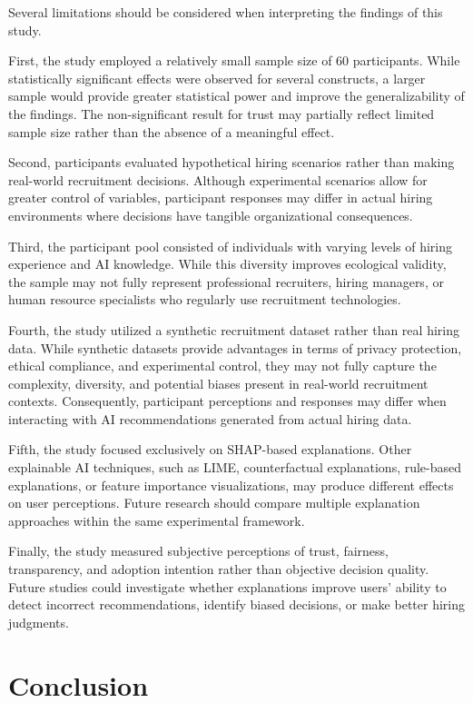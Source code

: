 \documentclass[conference]{IEEEtran}
\begin{document}
Several limitations should be considered when interpreting the findings of this study.

First, the study employed a relatively small sample size of 60 participants. While statistically significant effects were observed for several constructs, a larger sample would provide greater statistical power and improve the generalizability of the findings. The non-significant result for trust may partially reflect limited sample size rather than the absence of a meaningful effect.

Second, participants evaluated hypothetical hiring scenarios rather than making real-world recruitment decisions. Although experimental scenarios allow for greater control of variables, participant responses may differ in actual hiring environments where decisions have tangible organizational consequences.

Third, the participant pool consisted of individuals with varying levels of hiring experience and AI knowledge. While this diversity improves ecological validity, the sample may not fully represent professional recruiters, hiring managers, or human resource specialists who regularly use recruitment technologies.

Fourth, the study utilized a synthetic recruitment dataset rather than real hiring data. While synthetic datasets provide advantages in terms of privacy protection, ethical compliance, and experimental control, they may not fully capture the complexity, diversity, and potential biases present in real-world recruitment contexts. Consequently, participant perceptions and responses may differ when interacting with AI recommendations generated from actual hiring data.

Fifth, the study focused exclusively on SHAP-based explanations. Other explainable AI techniques, such as LIME, counterfactual explanations, rule-based explanations, or feature importance visualizations, may produce different effects on user perceptions. Future research should compare multiple explanation approaches within the same experimental framework.

Finally, the study measured subjective perceptions of trust, fairness, transparency, and adoption intention rather than objective decision quality. Future studies could investigate whether explanations improve users' ability to detect incorrect recommendations, identify biased decisions, or make better hiring judgments.

\section{Conclusion}
\end{document}
